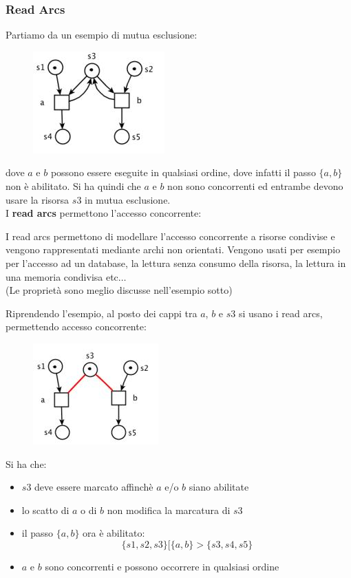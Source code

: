 \documentclass[a4paper,12pt, oneside]{book}
\begin{document}
\subsubsection{Read Arcs}
Partiamo da un esempio di mutua esclusione:
\begin{figure}[H]
  \centering
  \includegraphics[scale = 0.7]{img/ra.jpg}
\end{figure}
dove $a$ e $b$ possono essere eseguite in qualsiasi ordine, dove infatti
il passo $\{a, b\}$ non è abilitato. Si ha quindi che $a$ e $b$ non sono
concorrenti ed entrambe devono usare la risorsa $s3$ in mutua esclusione.\\
I \textbf{read arcs} permettono l'accesso concorrente:
\begin{definizione}
  I read arcs permettono di modellare l’accesso concorrente a risorse condivise
  e vengono rappresentati mediante archi non orientati. Vengono usati per
  esempio per l'accesso ad un database, la lettura senza consumo della risorsa,
  la lettura in una memoria condivisa etc$\ldots$ \\
  (Le proprietà sono meglio discusse nell'esempio sotto)
\end{definizione}
Riprendendo l'esempio, al posto dei cappi tra $a$, $b$ e $s3$ si usano i read
arcs, permettendo accesso concorrente:
\begin{figure}[H]
  \centering
  \includegraphics[scale = 0.7]{img/ra2.jpg}
\end{figure}

Si ha che:
\begin{itemize}
  \item $s3$ deve essere marcato affinchè $a$ e/o $b$ siano abilitate
  \item lo scatto di $a$ o di $b$ non modifica la marcatura di $s3$
  \item il passo $\{a, b\}$ ora è abilitato:
  \[\{s1,s2,s3\}[\{a,b\}>\{s3,s4,s5\}\]
  \item $a$ e $b$ sono concorrenti e possono occorrere in qualsiasi ordine
\end{itemize}
\end{document}
